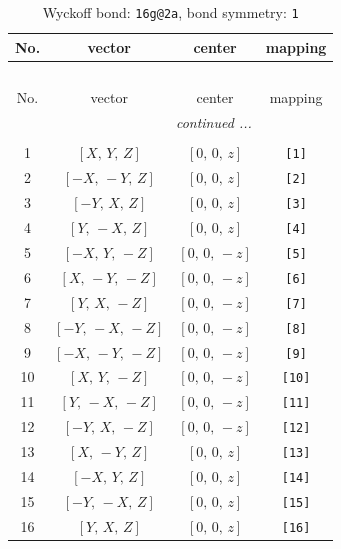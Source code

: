 \documentclass[fleqn,8pt]{jsarticle}
\begin{document}
\begin{longtable}{cccc}
\caption{Wyckoff bond: {\tt 16g@2a}, bond symmetry: {\tt 1}}
 \\
 \hline \hline
No. & vector & center & mapping \\ \hline \endfirsthead

\multicolumn{3}{l}{\tablename\ \thetable{}} \\
 \hline \hline
No. & vector & center & mapping \\ \hline \endhead

 \hline \hline
\multicolumn{3}{r}{\footnotesize\it continued ...} \\ \endfoot

 \hline \hline
\multicolumn{3}{r}{} \\ \endlastfoot

1 & $\left[ X,\, Y,\, Z \right]$ & $\left[ 0,\, 0,\, z \right]$ & {\tt [1]} \\ \hline
2 & $\left[ - X,\, - Y,\, Z \right]$ & $\left[ 0,\, 0,\, z \right]$ & {\tt [2]} \\ \hline
3 & $\left[ - Y,\, X,\, Z \right]$ & $\left[ 0,\, 0,\, z \right]$ & {\tt [3]} \\ \hline
4 & $\left[ Y,\, - X,\, Z \right]$ & $\left[ 0,\, 0,\, z \right]$ & {\tt [4]} \\ \hline
5 & $\left[ - X,\, Y,\, - Z \right]$ & $\left[ 0,\, 0,\, - z \right]$ & {\tt [5]} \\ \hline
6 & $\left[ X,\, - Y,\, - Z \right]$ & $\left[ 0,\, 0,\, - z \right]$ & {\tt [6]} \\ \hline
7 & $\left[ Y,\, X,\, - Z \right]$ & $\left[ 0,\, 0,\, - z \right]$ & {\tt [7]} \\ \hline
8 & $\left[ - Y,\, - X,\, - Z \right]$ & $\left[ 0,\, 0,\, - z \right]$ & {\tt [8]} \\ \hline
9 & $\left[ - X,\, - Y,\, - Z \right]$ & $\left[ 0,\, 0,\, - z \right]$ & {\tt [9]} \\ \hline
10 & $\left[ X,\, Y,\, - Z \right]$ & $\left[ 0,\, 0,\, - z \right]$ & {\tt [10]} \\ \hline
11 & $\left[ Y,\, - X,\, - Z \right]$ & $\left[ 0,\, 0,\, - z \right]$ & {\tt [11]} \\ \hline
12 & $\left[ - Y,\, X,\, - Z \right]$ & $\left[ 0,\, 0,\, - z \right]$ & {\tt [12]} \\ \hline
13 & $\left[ X,\, - Y,\, Z \right]$ & $\left[ 0,\, 0,\, z \right]$ & {\tt [13]} \\ \hline
14 & $\left[ - X,\, Y,\, Z \right]$ & $\left[ 0,\, 0,\, z \right]$ & {\tt [14]} \\ \hline
15 & $\left[ - Y,\, - X,\, Z \right]$ & $\left[ 0,\, 0,\, z \right]$ & {\tt [15]} \\ \hline
16 & $\left[ Y,\, X,\, Z \right]$ & $\left[ 0,\, 0,\, z \right]$ & {\tt [16]} \\
\end{longtable}
\end{document}
